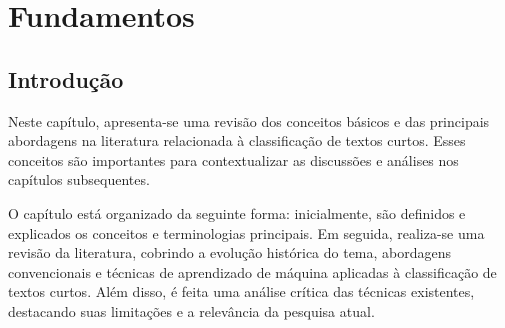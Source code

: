 \chapter{Fundamentos}

\section{Introdução}





Neste capítulo, apresenta-se uma revisão dos conceitos básicos e das principais abordagens na literatura relacionada à classificação de textos curtos. Esses conceitos são importantes para contextualizar as discussões e análises nos capítulos subsequentes.

O capítulo está organizado da seguinte forma: inicialmente, são definidos e explicados os conceitos e terminologias principais. Em seguida, realiza-se uma revisão da literatura, cobrindo a evolução histórica do tema, abordagens convencionais e técnicas de aprendizado de máquina aplicadas à classificação de textos curtos. Além disso, é feita uma análise crítica das técnicas existentes, destacando suas limitações e a relevância da pesquisa atual.


